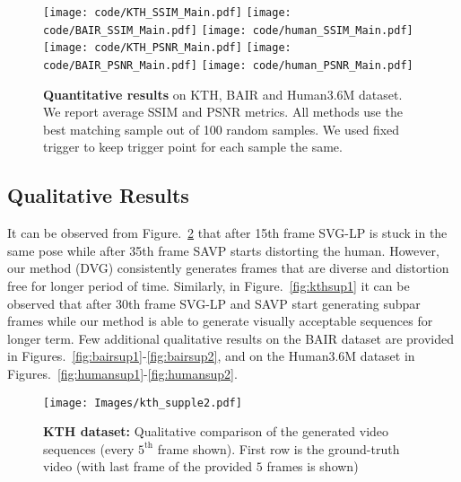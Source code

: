\documentclass{article} \usepackage{iclr2021_conference,times}
\begin{document}
 \begin{figure}[!h]
    \centering
\texttt{[image: code/KTH\_SSIM\_Main.pdf]}
    \texttt{[image: code/BAIR\_SSIM\_Main.pdf]}
    \texttt{[image: code/human\_SSIM\_Main.pdf]}\\
    \texttt{[image: code/KTH\_PSNR\_Main.pdf]}
    \texttt{[image: code/BAIR\_PSNR\_Main.pdf]}
    \texttt{[image: code/human\_PSNR\_Main.pdf]}
\caption{\textbf{Quantitative results} on KTH, BAIR and Human3.6M dataset. We report average SSIM and PSNR metrics. All methods use the best matching sample out of 100 random samples. We used fixed trigger to keep trigger point for each sample the same.}
    \label{fig:psnr_ssim}
\end{figure}




\subsection{Qualitative Results}
It can be observed from Figure.~\ref{fig:kthsup2} that after 15th frame SVG-LP is stuck in the same pose while after 35th frame SAVP starts distorting the human. However, our method (DVG) consistently generates frames that are diverse and distortion free for longer period of time. Similarly, in Figure.~\ref{fig:kthsup1} it can be observed that after 30th frame SVG-LP and SAVP start generating subpar frames while our method is able to generate visually acceptable sequences for longer term. Few additional qualitative results on the BAIR dataset are provided in Figures.~\ref{fig:bairsup1}-\ref{fig:bairsup2}, and on the Human3.6M dataset in Figures.~\ref{fig:humansup1}-\ref{fig:humansup2}.

\begin{figure}[t]
    \centering
    \texttt{[image: Images/kth\_supple2.pdf]}
    \caption{\textbf{KTH dataset:} Qualitative comparison of the generated video sequences (every $5^\text{th}$ frame shown). First row is the ground-truth video (with last frame of the provided $5$ frames is shown)}
    \label{fig:kthsup2}
\end{figure}
\end{document}
